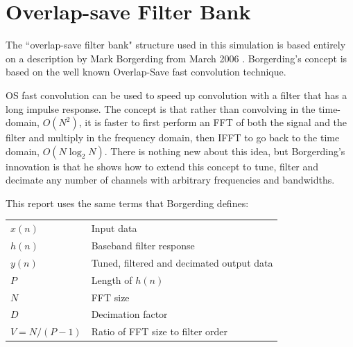 \documentclass[12pt]{report}
\begin{document}

\section{Overlap-save Filter Bank}
\label{sec:os_filter_bank}
The ``overlap-save filter bank" structure used in this simulation is based
entirely on a description by Mark Borgerding from March 2006
\cite{Borgerding1}.  Borgerding's concept is based on the well known
Overlap-Save fast convolution technique.

OS fast convolution can be used to speed up convolution with
a filter that has a long impulse response. The concept is that rather than
convolving in the time-domain, $O(N^2)$, it is faster to first
perform an FFT of both the signal and the filter and multiply in the frequency
domain, then IFFT to go back to the time domain, $O(N\log_2N)$.
There is nothing new about this idea, but Borgerding's innovation is that he
shows how to extend this concept to tune, filter and decimate any number of
channels with arbitrary frequencies and bandwidths.

This report uses the same terms that Borgerding defines:

\begin{tabular}{ll}
    $x(n)$        & Input data \\
    $h(n)$        & Baseband filter response \\
    $y(n)$        & Tuned, filtered and decimated output data \\
    $P$           & Length of $h(n)$ \\
    $N$           & FFT size \\
    $D$           & Decimation factor \\
    $V = N/(P-1)$ & Ratio of FFT size to filter order \\
\end{tabular}
\end{document}
